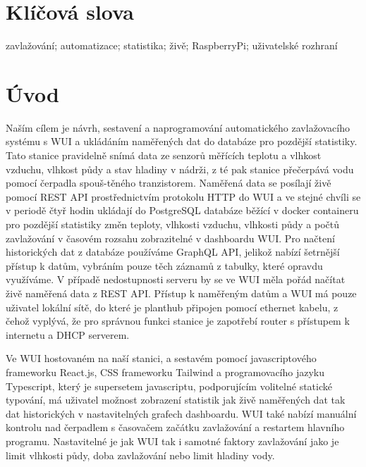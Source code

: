 \documentclass[12pt,a4paper]{article}
\begin{document}
\section*{Klíčová slova}

zavlažování; automatizace; statistika; živě; RaspberryPi; uživatelské rozhraní

\clearpage

\tableofcontents

\clearpage

\section{Úvod}

Naším cílem je návrh, sestavení a naprogramování automatického zavlažovacího
systému s WUI a ukládáním naměřených dat do databáze
pro pozdější statistiky. Tato stanice pravidelně snímá data ze senzorů měřících
teplotu a vlhkost vzduchu, vlhkost půdy a stav hladiny v nádrži, z té pak
stanice přečerpává vodu pomocí čerpadla spouš-těného tranzistorem. Naměřená data
se posílají živě pomocí REST API prostřednictvím
protokolu HTTP do WUI a ve stejné
chvíli se v periodě čtyř hodin ukládají do PostgreSQL databáze běžící v docker
containeru pro pozdější
statistiky
změn teploty, vlhkosti vzduchu, vlhkosti půdy a počtů zavlažování v časovém
rozsahu zobrazitelné v dashboardu WUI. Pro načtení historických dat z databáze
používáme GraphQL API, jelikož nabízí šetrnější přístup k datům, vybráním pouze
těch záznamů z tabulky, které opravdu využíváme. V případě nedostupnosti
serveru by se ve WUI měla pořád načítat živě naměřená data z REST API. Přístup
k naměřeným datům a
WUI má pouze
uživatel lokální
sítě, do které je planthub připojen pomocí ethernet kabelu, z čehož vyplývá, že
pro správnou funkci
stanice je zapotřebí router s přístupem k internetu a DHCP serverem.

Ve WUI hostovaném na naší stanici, a sestavém pomocí javascriptového frameworku
React.js, CSS frameworku
Tailwind a programovacího jazyku Typescript, který je supersetem javascriptu,
podporujícím volitelné statické typování, má uživatel
možnost zobrazení statistik jak živě naměřených dat tak dat historických v
nastavitelných grafech dashboardu. WUI také nabízí manuální kontrolu nad
čerpadlem s časovačem začátku zavlažování a restartem hlavního programu.
Nastavitelné je jak WUI tak i samotné faktory zavlažování jako je limit
vlhkosti
půdy, doba zavlažování nebo limit hladiny vody.
\end{document}
